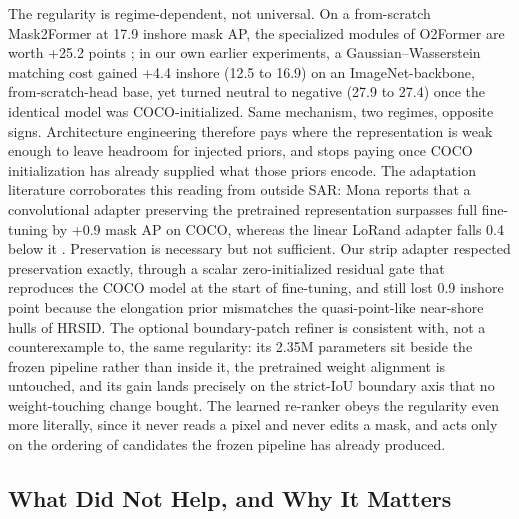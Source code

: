 The regularity is regime-dependent, not universal. On a from-scratch Mask2Former at 17.9 inshore mask AP, the specialized modules of O2Former are worth +25.2 points \cite{o2former2025}; in our own earlier experiments, a Gaussian--Wasserstein matching cost gained +4.4 inshore (12.5 to 16.9) on an ImageNet-backbone, from-scratch-head base, yet turned neutral to negative (27.9 to 27.4) once the identical model was COCO-initialized. Same mechanism, two regimes, opposite signs. Architecture engineering therefore pays where the representation is weak enough to leave headroom for injected priors, and stops paying once COCO initialization has already supplied what those priors encode. The adaptation literature corroborates this reading from outside SAR: Mona reports that a convolutional adapter preserving the pretrained representation surpasses full fine-tuning by +0.9 mask AP on COCO, whereas the linear LoRand adapter falls 0.4 below it \cite{mona2025}. Preservation is necessary but not sufficient. Our strip adapter respected preservation exactly, through a scalar zero-initialized residual gate that reproduces the COCO model at the start of fine-tuning, and still lost 0.9 inshore point because the elongation prior mismatches the quasi-point-like near-shore hulls of HRSID. The optional boundary-patch refiner is consistent with, not a counterexample to, the same regularity: its 2.35M parameters sit beside the frozen pipeline rather than inside it, the pretrained weight alignment is untouched, and its gain lands precisely on the strict-IoU boundary axis that no weight-touching change bought. The learned re-ranker obeys the regularity even more literally, since it never reads a pixel and never edits a mask, and acts only on the ordering of candidates the frozen pipeline has already produced.

\subsection{What Did Not Help, and Why It Matters}
\label{sec:disc-negatives}

